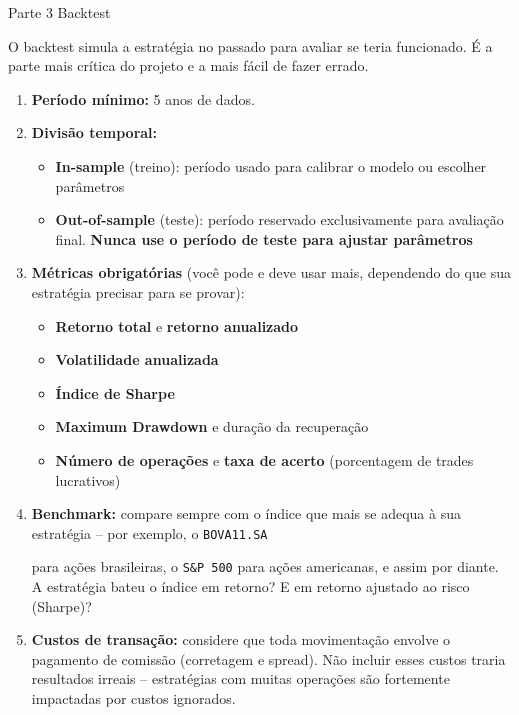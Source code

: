 \documentclass[11pt,a4paper]{article}
\newcommand{\code}[1]{%
  \colorbox{quantlightgray}{\texttt{\small\color{quantdark}#1}}%
}
\begin{document}
\begin{stepbox}{Parte 3 \quad Backtest}

O backtest simula a estrat\'egia no passado para avaliar se teria
funcionado. \'E a parte mais cr\'itica do projeto e a mais f\'acil
de fazer errado.

\begin{enumerate}
  \item \textbf{Per\'iodo m\'inimo:} 5 anos de dados.
        
  \item \textbf{Divis\~ao temporal:}
        \begin{itemize}
          \item \textbf{In-sample} (treino): per\'iodo usado para calibrar
                o modelo ou escolher par\^ametros
          \item \textbf{Out-of-sample} (teste): per\'iodo reservado
                exclusivamente para avalia\c{c}\~ao final.
                \textbf{Nunca use o per\'iodo de teste para ajustar par\^ametros}
        \end{itemize}

  \item \textbf{M\'etricas obrigat\'orias} (você pode e deve usar mais, dependendo do que sua estratégia precisar para se provar):
        \begin{itemize}
          \item \textbf{Retorno total} e \textbf{retorno anualizado}
          \item \textbf{Volatilidade anualizada}
          \item \textbf{\'Indice de Sharpe}
          \item \textbf{Maximum Drawdown} e dura\c{c}\~ao da recupera\c{c}\~ao
          \item \textbf{N\'umero de opera\c{c}\~oes} e \textbf{taxa de acerto}
                (porcentagem de trades lucrativos)
        \end{itemize}

  \item \textbf{Benchmark:} compare sempre com o \'indice que mais
        se adequa \`a sua estrat\'egia -- por exemplo, o \code{BOVA11.SA}
        para a\c{c}\~oes brasileiras, o \code{S\&P 500} para a\c{c}\~oes
        americanas, e assim por diante. A estrat\'egia bateu o \'indice
        em retorno? E em retorno ajustado ao risco (Sharpe)?

  \item \textbf{Custos de transa\c{c}\~ao:} considere que toda movimenta\c{c}\~ao
        envolve o pagamento de comiss\~ao (corretagem e spread).
        N\~ao incluir esses custos traria resultados irreais --
        estrat\'egias com muitas opera\c{c}\~oes s\~ao fortemente impactadas
        por custos ignorados.
\end{enumerate}


\end{stepbox}
\end{document}
